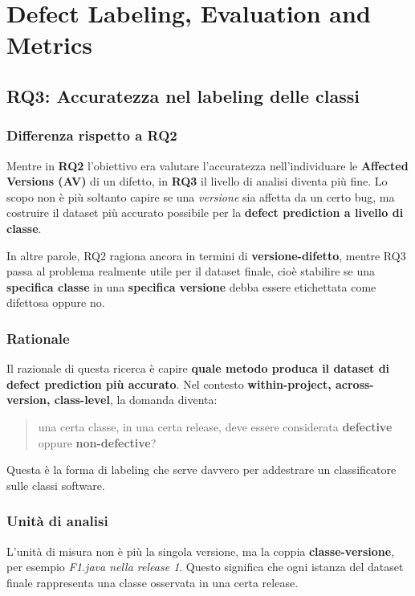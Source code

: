 \chapter{Defect Labeling, Evaluation and Metrics}

\section{RQ3: Accuratezza nel labeling delle classi}

\subsection{Differenza rispetto a RQ2}

Mentre in \textbf{RQ2} l'obiettivo era valutare l'accuratezza nell'individuare le \textbf{Affected Versions (AV)} di un difetto, in \textbf{RQ3} il livello di analisi diventa più fine. Lo scopo non è più soltanto capire se una \emph{versione} sia affetta da un certo bug, ma costruire il dataset più accurato possibile per la \textbf{defect prediction a livello di classe}.

In altre parole, RQ2 ragiona ancora in termini di \textbf{versione-difetto}, mentre RQ3 passa al problema realmente utile per il dataset finale, cioè stabilire se una \textbf{specifica classe} in una \textbf{specifica versione} debba essere etichettata come difettosa oppure no.

\subsection{Rationale}

Il razionale di questa ricerca è capire \textbf{quale metodo produca il dataset di defect prediction più accurato}. Nel contesto \textbf{within-project, across-version, class-level}, la domanda diventa:

\begin{quote}
una certa classe, in una certa release, deve essere considerata \textbf{defective} oppure \textbf{non-defective}?
\end{quote}

Questa è la forma di labeling che serve davvero per addestrare un classificatore sulle classi software.

\subsection{Unità di analisi}

L'unità di misura non è più la singola versione, ma la coppia \textbf{classe-versione}, per esempio \emph{F1.java nella release 1}. Questo significa che ogni istanza del dataset finale rappresenta una classe osservata in una certa release.

